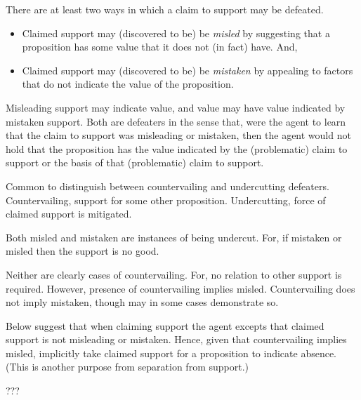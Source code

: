 \begin{note}
  \begin{proposition}
    There are at least two ways in which a claim to support may be defeated.
      \begin{itemize}
      \item Claimed support may (discovered to be) be \emph{misled} by suggesting that a proposition has some value that it does not (in fact) have. And,
      \item Claimed support may (discovered to be) be \emph{mistaken} by appealing to factors that do not indicate the value of the proposition.
      \end{itemize}
      \vspace{-\topsep}\vspace{-\topsep}
  \end{proposition}
  Misleading support may indicate value, and value may have value indicated by mistaken support.
  Both are defeaters in the sense that, were the agent to learn that the claim to support was misleading or mistaken, then the agent would not hold that the proposition has the value indicated by the (problematic) claim to support or the basis of that (problematic) claim to support.

  Common to distinguish between countervailing and undercutting defeaters.
  Countervailing, support for some other proposition.
  Undercutting, force of claimed support is mitigated.

  Both misled and mistaken are instances of being undercut.
  For, if mistaken or misled then the support is no good.

  Neither are clearly cases of countervailing.
  For, no relation to other support is required.
  However, presence of countervailing implies misled.
  Countervailing does not imply mistaken, though may in some cases demonstrate so.

  Below suggest that when claiming support the agent excepts that claimed support is not misleading or mistaken.
  Hence, given that countervailing implies misled, implicitly take claimed support for a proposition to indicate absence.
  (This is another purpose from separation from support.)

  ???
\end{note}

